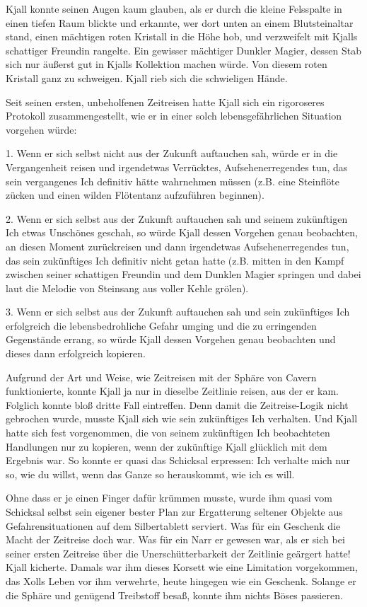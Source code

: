\documentclass[10pt, a4paper, oneside]{book}
\begin{document}
Kjall konnte seinen Augen kaum glauben, als er durch die kleine Felsspalte in einen tiefen Raum blickte und erkannte, wer dort unten an einem Blutsteinaltar stand, einen mächtigen roten Kristall in die Höhe hob, und verzweifelt mit Kjalls schattiger Freundin rangelte. Ein gewisser mächtiger Dunkler Magier, dessen Stab sich nur äußerst gut in Kjalls Kollektion machen würde. Von diesem roten Kristall ganz zu schweigen. Kjall rieb sich die schwieligen Hände.

Seit seinen ersten, unbeholfenen Zeitreisen hatte Kjall sich ein rigoroseres Protokoll zusammengestellt, wie er in einer solch lebensgefährlichen Situation vorgehen würde:

1. Wenn er sich selbst nicht aus der Zukunft auftauchen sah, würde er in die Vergangenheit reisen und irgendetwas Verrücktes, Aufsehenerregendes tun, das sein vergangenes Ich definitiv hätte wahrnehmen müssen (z.B. eine Steinflöte zücken und einen wilden Flötentanz aufzuführen beginnen).

2. Wenn er sich selbst aus der Zukunft auftauchen sah und seinem zukünftigen Ich etwas Unschönes geschah, so würde Kjall dessen Vorgehen genau beobachten, an diesen Moment zurückreisen und dann irgendetwas Aufsehenerregendes tun, das sein zukünftiges Ich definitiv nicht getan hatte (z.B. mitten in den Kampf zwischen seiner schattigen Freundin und dem Dunklen Magier springen und dabei laut die Melodie von Steinsang aus voller Kehle grölen).

3. Wenn er sich selbst aus der Zukunft auftauchen sah und sein zukünftiges Ich erfolgreich die lebensbedrohliche Gefahr umging und die zu erringenden Gegenstände errang, so würde Kjall dessen Vorgehen genau beobachten und dieses dann erfolgreich kopieren.

Aufgrund der Art und Weise, wie Zeitreisen mit der Sphäre von Cavern funktionierte, konnte Kjall ja nur in dieselbe Zeitlinie reisen, aus der er kam. Folglich konnte bloß dritte Fall eintreffen. Denn damit die Zeitreise-Logik nicht gebrochen wurde, musste Kjall sich wie sein zukünftiges Ich verhalten. Und Kjall hatte sich fest vorgenommen, die von seinem zukünftigen Ich beobachteten Handlungen nur zu kopieren, wenn der zukünftige Kjall glücklich mit dem Ergebnis war. So konnte er quasi das Schicksal erpressen: Ich verhalte mich nur so, wie du willst, wenn das Ganze so herauskommt, wie ich es will.

Ohne dass er je einen Finger dafür krümmen musste, wurde ihm quasi vom Schicksal selbst sein eigener bester Plan zur Ergatterung seltener Objekte aus Gefahrensituationen auf dem Silbertablett serviert. Was für ein Geschenk die Macht der Zeitreise doch war. Was für ein Narr er gewesen war, als er sich bei seiner ersten Zeitreise über die Unerschütterbarkeit der Zeitlinie geärgert hatte! Kjall kicherte. Damals war ihm dieses Korsett wie eine Limitation vorgekommen, das Xolls Leben vor ihm verwehrte, heute hingegen wie ein Geschenk. Solange er die Sphäre und genügend Treibstoff besaß, konnte ihm nichts Böses passieren.
\end{document}
